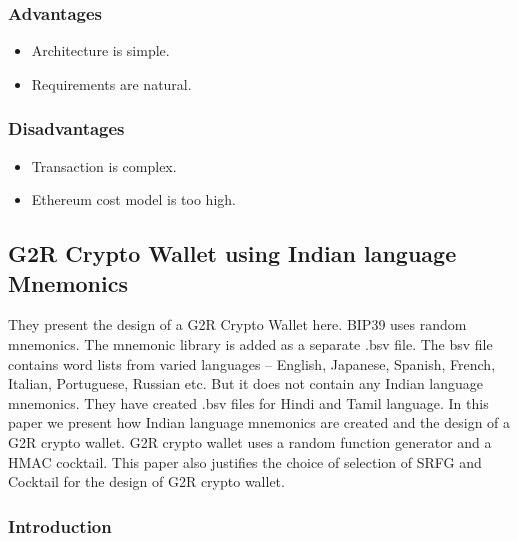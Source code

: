 \documentclass[12pt]{article}
\begin{document}
\newpage
\subsubsection{Advantages}
\begin{itemize}
\item Architecture is simple.
\item Requirements are natural.

\end{itemize}
\vspace{10px}
\subsubsection{Disadvantages}
\begin{itemize}
\item Transaction is complex.
\item Ethereum cost model is too high.

\end{itemize}
\vspace{10px}





\newpage
\subsection{G2R Crypto Wallet using Indian language Mnemonics }

They present the design of a G2R Crypto Wallet
here. BIP39 uses random mnemonics. The mnemonic
library is added as a separate .bsv file. The bsv file contains
word lists from varied languages – English, Japanese,
Spanish, French, Italian, Portuguese, Russian etc. But it
does not contain any Indian language mnemonics. They have
created .bsv files for Hindi and Tamil language. In this
paper we present how Indian language mnemonics are
created and the design of a G2R crypto wallet. G2R crypto
wallet uses a random function generator and a HMAC
cocktail. This paper also justifies the choice of selection of
SRFG and Cocktail for the design of G2R crypto wallet.

\subsubsection{Introduction}
\end{document}
